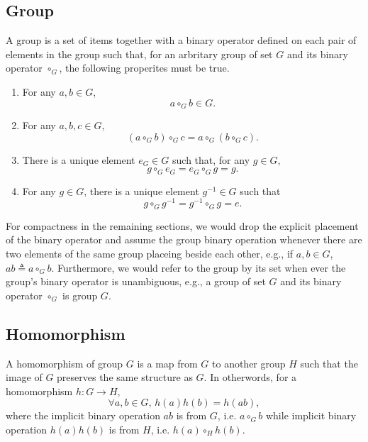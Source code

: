 \documentclass[preprint, 12pt]{revtex4-2}
\numberwithin{equation}{section}
\begin{document}
\subsection{Group}
A group is a set of items together with a binary operator defined on each pair of elements in the group such that, for an arbritary group of set $G$ and its binary operator $\circ_G$, the following properites must be true.
\begin{enumerate}
    \item For any $a, b\in G$,
        \begin{equation}\label{eq:group_closed}
            a\circ_G b\in G.
        \end{equation}
    \item For any $a, b, c\in G$, 
        \begin{equation}\label{eq:group_associative}
            (a\circ_G b)\circ_G c = a\circ_G(b\circ_G c).
        \end{equation}
    \item There is a unique element $e_G\in G$ such that, for any $g\in G$,
        \begin{equation}\label{eq:group_identity}
            g\circ_G e_G=e_G\circ_G g=g.
        \end{equation}
    \item For any $g\in G$, there is a unique element $g^{-1}\in G$ such that 
        \begin{equation}\label{eq:group_inverse}
            g\circ_G g^{-1}=g^{-1}\circ_G g=e.
        \end{equation}
\end{enumerate}

For compactness in the remaining sections, we would drop the explicit placement of the binary operator and assume the group binary operation whenever there are two elements of the same group placeing beside each other, e.g., if $a, b\in G$, $ab\triangleq a\circ_G b$. Furthermore, we would refer to the group by its set when ever the group's binary operator is unambiguous, e.g., a group of set $G$ and its binary operator $\circ_G$ is group $G$.

\subsection{Homomorphism}
A homomorphism of group $G$ is a map from $G$ to another group $H$ such that the image of $G$ preserves the same structure as $G$. In otherwords, for a homomorphism $h:G\rightarrow H$,
\begin{equation}\label{eq:homomorphism}
    \forall a, b\in G,\, h(a)h(b) = h(ab),
\end{equation}
where the implicit binary operation $ab$ is from $G$, i.e. $a\circ_G b$ while implicit binary operation $h(a)h(b)$ is from $H$, i.e. $h(a)\circ_H h(b)$.
\end{document}
